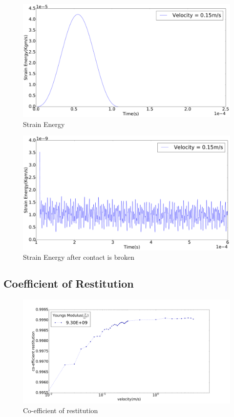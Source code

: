 \begin{figure}[H]
\includegraphics[width=1.0\textwidth]{../images/StrainEnergy/SE_pdf.pdf}
\caption{Strain Energy}
\label{fig:SE}
\end{figure}
\begin{figure}[H]
\includegraphics[width=1.0\textwidth]{../images/StrainEnergy/SEzoomed_pdf.pdf}
\caption{Strain Energy after contact is broken}
\label{fig:SEzoomed}
\end{figure}


\subsection{Coefficient of Restitution}

\begin{figure}[H]
\includegraphics[width=1.0\textwidth]{../images/COR/COR_pdf.pdf}
\caption{Co-efficient of restitution}
\label{fig:COR}
\end{figure}

